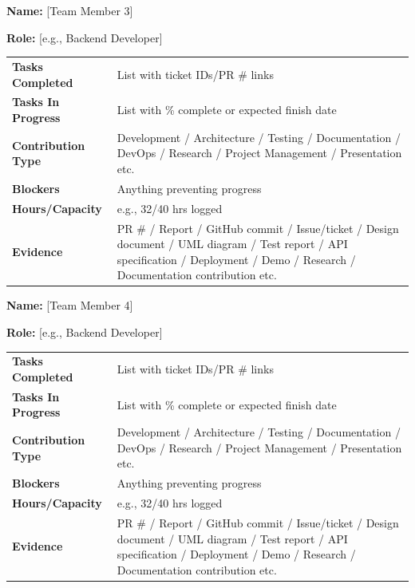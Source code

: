\documentclass[11pt,a4paper]{article}
\newcommand{\field}[2]{\textbf{#1:} #2\par}
\begin{document}
\vspace{10pt}

\field{Name}{[Team Member 3]}
\field{Role}{[e.g., Backend Developer]}

\vspace{4pt}

\begin{tabular}{>{\bfseries}p{} p{}}
\toprule
Tasks Completed & List with ticket IDs/PR \# links \\
Tasks In Progress & List with \% complete or expected finish date \\
Contribution Type & Development / Architecture / Testing / Documentation / DevOps / Research / Project Management / Presentation etc.\\
Blockers & Anything preventing progress \\
Hours/Capacity & e.g., 32/40 hrs logged \\
Evidence & PR \# / Report / GitHub commit / Issue/ticket / Design document / UML diagram / Test report / API specification / Deployment / Demo / Research / Documentation contribution etc.\\
\bottomrule
\end{tabular}

\vspace{10pt}

\field{Name}{[Team Member 4]}
\field{Role}{[e.g., Backend Developer]}

\vspace{4pt}

\begin{tabular}{>{\bfseries}p{} p{}}
\toprule
Tasks Completed & List with ticket IDs/PR \# links \\
Tasks In Progress & List with \% complete or expected finish date \\
Contribution Type & Development / Architecture / Testing / Documentation / DevOps / Research / Project Management / Presentation etc.\\
Blockers & Anything preventing progress \\
Hours/Capacity & e.g., 32/40 hrs logged \\
Evidence & PR \# / Report / GitHub commit / Issue/ticket / Design document / UML diagram / Test report / API specification / Deployment / Demo / Research / Documentation contribution etc.\\
\bottomrule
\end{tabular}

\vspace{10pt}
\end{document}
